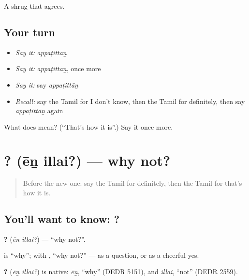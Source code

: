 \begin{grammarlens}[title={What you've built}]
A shrug that agrees.
\end{grammarlens}

\subsection*{Your turn}
\begin{itemize}
\raggedright
  \item \emph{Say it:} \emph{appaṭittāṉ}
  \item \emph{Say it:} \emph{appaṭittāṉ}, once more
  \item \emph{Say it:} say \emph{appaṭittāṉ}
  \item \emph{Recall:} say the Tamil for I don't know, then the Tamil for definitely, then say \emph{appaṭittāṉ} again
\end{itemize}

\begin{tcolorbox}[breakable,colback=teal!4,colframe=teal!35!black,title={Before you move on}]
What does  mean? (\textquotedblleft{}That's how it is\textquotedblright{}.) Say it once more.
\end{tcolorbox}
\section[\texorpdfstring{\ta{ஏன்} \ta{இல்லை}? (ēṉ illai?)}{ஏன் இல்லை? (ēṉ illai?)}]{ ? (ēṉ illai?) — why not?}

\label{lesson:TA-C97-whynot}



\begin{quote}
Before the new one: say the Tamil for definitely, then the Tamil for that's how it is.
\end{quote}

\subsection*{You'll want to know:  ?}
\textbf{ ?} (\emph{ēṉ illai?}) — \textquotedblleft{}why not?\textquotedblright{}.

\textbf{} is \textquotedblleft{}why\textquotedblright{}; with \textbf{}, \textquotedblleft{}why not?\textquotedblright{} — as a question, or as a cheerful yes.

\begin{cousinweb}
\textbf{ ?} (\emph{ēṉ illai?}) is native: \emph{ēṉ}, \textquotedblleft{}why\textquotedblright{} (DEDR 5151), and \emph{illai}, \textquotedblleft{}not\textquotedblright{} (DEDR 2559).
\end{cousinweb}

